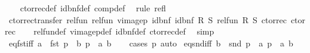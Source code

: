 \begin{isabellebody}
%
\isadelimproof
\ \ %
\endisadelimproof
%
\isatagproof
{}\isamarkupfalse%
\ ctor{\isacharunderscore}{\kern0pt}rec{\isacharunderscore}{\kern0pt}def\ id{\isacharunderscore}{\kern0pt}bnf{\isacharunderscore}{\kern0pt}def\ comp{\isacharunderscore}{\kern0pt}def\ \isamarkupfalse%
\ {\isacharparenleft}{\kern0pt}rule\ refl{\isacharparenright}{\kern0pt}%
\endisatagproof
{\isafoldproof}%
%
\isadelimproof
\isanewline
%
\endisadelimproof
\isanewline
{}\isamarkupfalse%
\ ctor{\isacharunderscore}{\kern0pt}rec{\isacharunderscore}{\kern0pt}transfer{\isacharcolon}{\kern0pt}\ {\isachardoublequoteopen}rel{\isacharunderscore}{\kern0pt}fun\ {\isacharparenleft}{\kern0pt}rel{\isacharunderscore}{\kern0pt}fun\ {\isacharparenleft}{\kern0pt}vimage{}p\ id{\isacharunderscore}{\kern0pt}bnf\ id{\isacharunderscore}{\kern0pt}bnf\ R{\isacharparenright}{\kern0pt}\ S{\isacharparenright}{\kern0pt}\ {\isacharparenleft}{\kern0pt}rel{\isacharunderscore}{\kern0pt}fun\ R\ S{\isacharparenright}{\kern0pt}\ ctor{\isacharunderscore}{\kern0pt}rec\ ctor{\isacharunderscore}{\kern0pt}rec{\isachardoublequoteclose}\isanewline
%
\isadelimproof
\ \ %
\endisadelimproof
%
\isatagproof
{}\isamarkupfalse%
\ rel{\isacharunderscore}{\kern0pt}fun{\isacharunderscore}{\kern0pt}def\ vimage{}p{\isacharunderscore}{\kern0pt}def\ id{\isacharunderscore}{\kern0pt}bnf{\isacharunderscore}{\kern0pt}def\ ctor{\isacharunderscore}{\kern0pt}rec{\isacharunderscore}{\kern0pt}def\ \isamarkupfalse%
\ simp%
\endisatagproof
{\isafoldproof}%
%
\isadelimproof
\isanewline
%
\endisadelimproof
\isanewline
{}\isamarkupfalse%
\ eq{\isacharunderscore}{\kern0pt}fst{\isacharunderscore}{\kern0pt}iff{\isacharcolon}{\kern0pt}\ {\isachardoublequoteopen}a\ {\isacharequal}{\kern0pt}\ fst\ p\ {\isasymlongleftrightarrow}\ {\isacharparenleft}{\kern0pt}{\isasymexists}b{\isachardot}{\kern0pt}\ p\ {\isacharequal}{\kern0pt}\ {\isacharparenleft}{\kern0pt}a{\isacharcomma}{\kern0pt}\ b{\isacharparenright}{\kern0pt}{\isacharparenright}{\kern0pt}{\isachardoublequoteclose}\isanewline
%
\isadelimproof
\ \ %
\endisadelimproof
%
\isatagproof
{}\isamarkupfalse%
\ {\isacharparenleft}{\kern0pt}cases\ p{\isacharparenright}{\kern0pt}\ auto%
\endisatagproof
{\isafoldproof}%
%
\isadelimproof
\isanewline
%
\endisadelimproof
\isanewline
{}\isamarkupfalse%
\ eq{\isacharunderscore}{\kern0pt}snd{\isacharunderscore}{\kern0pt}iff{\isacharcolon}{\kern0pt}\ {\isachardoublequoteopen}b\ {\isacharequal}{\kern0pt}\ snd\ p\ {\isasymlongleftrightarrow}\ {\isacharparenleft}{\kern0pt}{\isasymexists}a{\isachardot}{\kern0pt}\ p\ {\isacharequal}{\kern0pt}\ {\isacharparenleft}{\kern0pt}a{\isacharcomma}{\kern0pt}\ b{\isacharparenright}{\kern0pt}{\isacharparenright}{\kern0pt}{\isachardoublequoteclose}\isanewline

\end{isabellebody}
